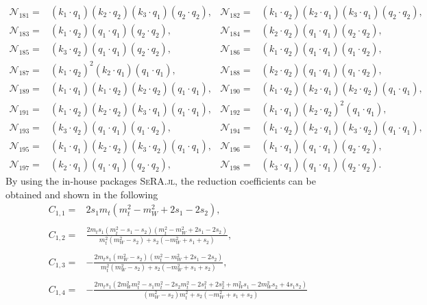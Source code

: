 \documentclass[twocolumn,aps,showpacs,nofootinbib,superscriptaddress,prd]{revtex4-2}
\begin{document}
\begin{widetext}
\begin{align}
{\mathcal N}_{181}=&(k_1\cdot q_1) (k_2\cdot q_2) (k_3\cdot q_1) (q_2\cdot q_2),&
{\mathcal N}_{182}=&(k_1\cdot q_2) (k_2\cdot q_1) (k_3\cdot q_1) (q_2\cdot q_2),\nonumber\\
{\mathcal N}_{183}=&(k_1\cdot q_2) (q_1\cdot q_1) (q_2\cdot q_2),&
{\mathcal N}_{184}=&(k_2\cdot q_2) (q_1\cdot q_1) (q_2\cdot q_2),\nonumber\\
{\mathcal N}_{185}=&(k_3\cdot q_2) (q_1\cdot q_1) (q_2\cdot q_2),&
{\mathcal N}_{186}=&(k_1\cdot q_2) (q_1\cdot q_1) (q_1\cdot q_2),\nonumber\\
{\mathcal N}_{187}=&(k_1\cdot q_2)^2 (k_2\cdot q_1) (q_1\cdot q_1),&
{\mathcal N}_{188}=&(k_2\cdot q_2) (q_1\cdot q_1) (q_1\cdot q_2),\nonumber\\
{\mathcal N}_{189}=&(k_1\cdot q_1) (k_1\cdot q_2) (k_2\cdot q_2) (q_1\cdot q_1),&
{\mathcal N}_{190}=&(k_1\cdot q_2) (k_2\cdot q_1) (k_2\cdot q_2) (q_1\cdot q_1),\nonumber\\
{\mathcal N}_{191}=&(k_1\cdot q_2) (k_2\cdot q_2) (k_3\cdot q_1) (q_1\cdot q_1),&
{\mathcal N}_{192}=&(k_1\cdot q_1) (k_2\cdot q_2)^2 (q_1\cdot q_1),\nonumber\\
{\mathcal N}_{193}=&(k_3\cdot q_2) (q_1\cdot q_1) (q_1\cdot q_2),&
{\mathcal N}_{194}=&(k_1\cdot q_2) (k_2\cdot q_1) (k_3\cdot q_2) (q_1\cdot q_1),\nonumber\\
{\mathcal N}_{195}=&(k_1\cdot q_1) (k_2\cdot q_2) (k_3\cdot q_2) (q_1\cdot q_1),&
{\mathcal N}_{196}=&(k_1\cdot q_1) (q_1\cdot q_1) (q_2\cdot q_2),\nonumber\\
{\mathcal N}_{197}=&(k_2\cdot q_1) (q_1\cdot q_1) (q_2\cdot q_2),&
{\mathcal N}_{198}=&(k_3\cdot q_1) (q_1\cdot q_1) (q_2\cdot q_2).
\end{align}
By using the in-house packages \textsc{SeRA.jl}, the reduction coefficients can be obtained and shown in the following
\begin{align}
C_{1,1}=&2s_1m_t\left(m_t^2-m_W^2+2s_1-2s_2\right)
,\nonumber\\
\nonumber\\
C_{1,2}=&\frac{2m_ts_1\left(m_t^2-s_1-s_2\right)\left(m_t^2-m_W^2+2s_1-2s_2\right)}{m_t^2\left(m_W^2-s_2\right)+s_2
\left(-m_W^2+s_1+s_2\right)}
,\nonumber\\
\nonumber\\
C_{1,3}=&-\frac{2m_ts_1\left(m_W^2-s_2\right)\left(m_t^2-m_W^2+2s_1-2s_2\right)}{m_t^2\left(m_W^2-s_2\right)+s_2
\left(-m_W^2+s_1+s_2\right)}
,\nonumber\\
\nonumber\\
C_{1,4}=&-\frac{2m_ts_1\left(2m_W^2m_t^2-s_1m_t^2-2s_2m_t^2-2s_1^2+2s_2^2+m_W^2s_1-2m_W^2s_2+4s_1s_2\right)}{\left(m_W^2-s_2\right)m_t^2+s_2\left(-m_W^2+s_1+s_2\right)}

\end{align}
\end{widetext}
\end{document}

